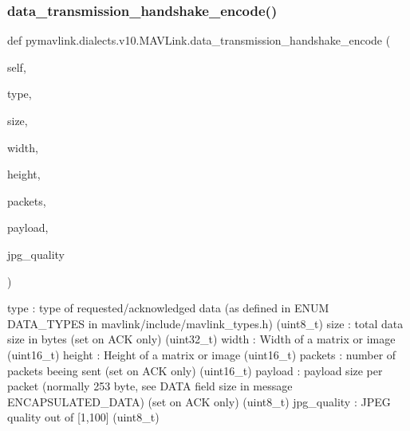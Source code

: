 \begin{DoxyVerb}
\begin{DoxyVerb}
\subsubsection{\texorpdfstring{data\+\_\+transmission\+\_\+handshake\+\_\+encode()}{data\_transmission\_handshake\_encode()}}
{\footnotesize\ttfamily def pymavlink.\+dialects.\+v10.\+M\+A\+V\+Link.\+data\+\_\+transmission\+\_\+handshake\+\_\+encode (\begin{DoxyParamCaption}\item[{}]{self,  }\item[{}]{type,  }\item[{}]{size,  }\item[{}]{width,  }\item[{}]{height,  }\item[{}]{packets,  }\item[{}]{payload,  }\item[{}]{jpg\+\_\+quality }\end{DoxyParamCaption})}

\begin{DoxyVerb}type                      : type of requested/acknowledged data (as defined in ENUM DATA_TYPES in mavlink/include/mavlink_types.h) (uint8_t)
size                      : total data size in bytes (set on ACK only) (uint32_t)
width                     : Width of a matrix or image (uint16_t)
height                    : Height of a matrix or image (uint16_t)
packets                   : number of packets beeing sent (set on ACK only) (uint16_t)
payload                   : payload size per packet (normally 253 byte, see DATA field size in message ENCAPSULATED_DATA) (set on ACK only) (uint8_t)
jpg_quality               : JPEG quality out of [1,100] (uint8_t)\end{DoxyVerb}
 \mbox{\label{classpymavlink_1_1dialects_1_1v10_1_1MAVLink_ac53be48c97d9cd12e5d0b5b6d0b3bd8c}} 

\end{DoxyVerb}
\end{DoxyVerb}
